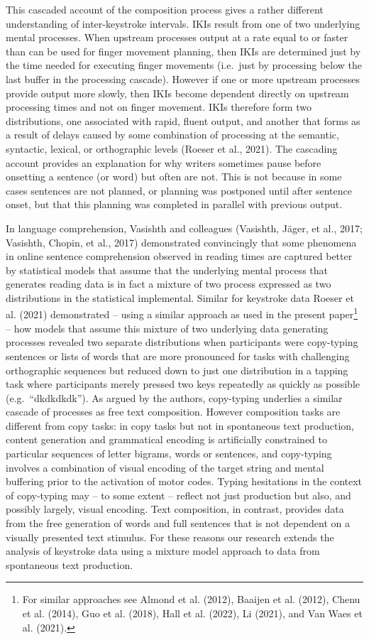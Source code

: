 \documentclass[
  man,floatsintext]{apa7}
\begin{document}
This cascaded account of the composition process gives a rather different understanding of inter-keystroke intervals. IKIs result from one of two underlying mental processes. When upstream processes output at a rate equal to or faster than can be used for finger movement planning, then IKIs are determined just by the time needed for executing finger movements (i.e.~just by processing below the last buffer in the processing cascade). However if one or more upstream processes provide output more slowly, then IKIs become dependent directly on upstream processing times and not on finger movement. IKIs therefore form two distributions, one associated with rapid, fluent output, and another that forms as a result of delays caused by some combination of processing at the semantic, syntactic, lexical, or orthographic levels (Roeser et al., 2021). The cascading account provides an explanation for why writers sometimes pause before onsetting a sentence (or word) but often are not. This is not because in some cases sentences are not planned, or planning was postponed until after sentence onset, but that this planning was completed in parallel with previous output.

In language comprehension, Vasishth and colleagues (Vasishth, Jäger, et al., 2017; Vasishth, Chopin, et al., 2017) demonstrated convincingly that some phenomena in online sentence comprehension observed in reading times are captured better by statistical models that assume that the underlying mental process that generates reading data is in fact a mixture of two process expressed as two distributions in the statistical implemental. Similar for keystroke data Roeser et al. (2021) demonstrated -- using a similar approach as used in the present paper\footnote{For similar approaches see Almond et al. (2012), Baaijen et al. (2012), Chenu et al. (2014), Guo et al. (2018), Hall et al. (2022), Li (2021), and Van Waes et al. (2021).} -- how models that assume this mixture of two underlying data generating processes revealed two separate distributions when participants were copy-typing sentences or lists of words that are more pronounced for tasks with challenging orthographic sequences but reduced down to just one distribution in a tapping task where participants merely pressed two keys repeatedly as quickly as possible (e.g.~\enquote{dkdkdkdk}). As argued by the authors, copy-typing underlies a similar cascade of processes as free text composition. However composition tasks are different from copy tasks: in copy tasks but not in spontaneous text production, content generation and grammatical encoding is artificially constrained to particular sequences of letter bigrams, words or sentences, and copy-typing involves a combination of visual encoding of the target string and mental buffering prior to the activation of motor codes. Typing hesitations in the context of copy-typing may -- to some extent -- reflect not just production but also, and possibly largely, visual encoding. Text composition, in contrast, provides data from the free generation of words and full sentences that is not dependent on a visually presented text stimulus. For these reasons our research extends the analysis of keystroke data using a mixture model approach to data from spontaneous text production.
\end{document}
